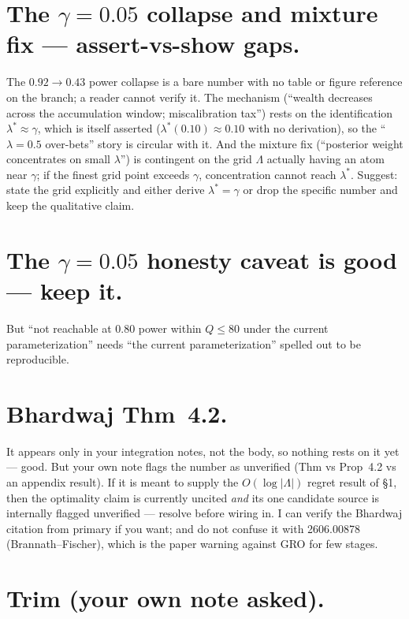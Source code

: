 \documentclass[11pt]{article}
\begin{document}
\section{The $\gamma = 0.05$ collapse and mixture fix --- assert-vs-show gaps.}

The $0.92 \to 0.43$ power collapse is a bare number with no table or figure
reference on the branch; a reader cannot verify it.
The mechanism (``wealth decreases across the accumulation window; miscalibration
tax'') rests on the identification $\lambda^* \approx \gamma$, which is itself
asserted ($\lambda^*(0.10) \approx 0.10$ with no derivation), so the
``$\lambda = 0.5$ over-bets'' story is circular with it.
And the mixture fix (``posterior weight concentrates on small $\lambda$'') is
contingent on the grid $\Lambda$ actually having an atom near $\gamma$; if the
finest grid point exceeds $\gamma$, concentration cannot reach $\lambda^*$.
Suggest: state the grid explicitly and either derive $\lambda^* = \gamma$ or drop
the specific number and keep the qualitative claim.

\section{The $\gamma = 0.05$ honesty caveat is good --- keep it.}

But ``not reachable at 0.80 power within $Q \le 80$ under the current
parameterization'' needs ``the current parameterization'' spelled out to be
reproducible.

\section{Bhardwaj Thm~4.2.}

It appears only in your integration notes, not the body, so nothing rests on it
yet --- good.
But your own note flags the number as unverified (Thm vs Prop~4.2 vs an appendix
result).
If it is meant to supply the $O(\log|\Lambda|)$ regret result of \S1, then the
optimality claim is currently uncited \emph{and} its one candidate source is
internally flagged unverified --- resolve before wiring in.
I can verify the Bhardwaj citation from primary if you want; and do not confuse it
with 2606.00878 (Brannath--Fischer), which is the paper warning against GRO for
few stages.

\section{Trim (your own note asked).}
\end{document}
